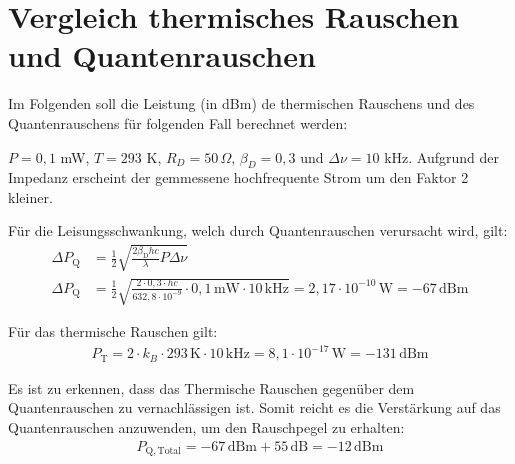 
\section{Vergleich thermisches Rauschen und Quantenrauschen}

Im Folgenden soll die Leistung (in dBm) de thermischen Rauschens und des Quantenrauschens für folgenden Fall berechnet werden:

$P = 0,1$ mW, $T = 293$ K, $R_D = 50\, \Omega$, $\beta_D = 0,3$ und $\Delta \nu = 10$ kHz. Aufgrund der Impedanz erscheint der gemmessene hochfrequente Strom um den Faktor 2 kleiner.

Für die Leisungsschwankung, welch durch Quantenrauschen verursacht wird, gilt:
\begin{align}
    \Delta P_\mathrm{Q} &= \frac{1}{2} \sqrt{\frac{2\beta_\mathrm{D} h c}{\lambda}P \Delta \nu}\\
    \Delta P_\mathrm{Q} &= \frac{1}{2} \sqrt{\frac{2 \cdot 0,3\cdot h c}{632,8 \cdot 10^{-9}} \cdot 0,1\, \text{mW} \cdot 10 \, \text{kHz}} = 2,17 \cdot 10^{-10}\, \text{W} = -67\, \text{dBm}
\end{align}

Für das thermische Rauschen gilt:
\begin{gather}
    P_\mathrm{T} = 2 \cdot k_B \cdot 293\,\text{K} \cdot 10\,\text{kHz} = 8,1 \cdot 10^{-17}\, \text{W} = -131 \, \text{dBm}
\end{gather}

Es ist zu erkennen, dass das Thermische Rauschen gegenüber dem Quantenrauschen zu vernachlässigen ist.
Somit reicht es die Verstärkung auf das Quantenrauschen anzuwenden, um den Rauschpegel zu erhalten:
\begin{gather}
    P_\mathrm{Q,Total} = -67 \, \text{dBm} + 55\, \text{dB} = -12 \, \text{dBm}
\end{gather}